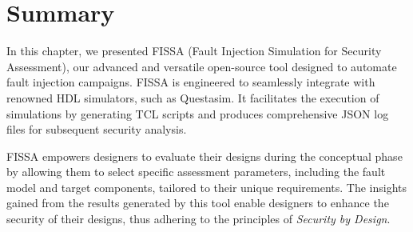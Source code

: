 \section{Summary}
In this chapter, we presented FISSA (Fault Injection Simulation for Security Assessment), our advanced and versatile open-source tool designed to automate fault injection campaigns. FISSA is engineered to seamlessly integrate with renowned HDL simulators, such as Questasim. It facilitates the execution of simulations by generating TCL scripts and produces comprehensive JSON log files for subsequent security analysis.

FISSA empowers designers to evaluate their designs during the conceptual phase by allowing them to select specific assessment parameters, including the fault model and target components, tailored to their unique requirements. The insights gained from the results generated by this tool enable designers to enhance the security of their designs, thus adhering to the principles of \textit{Security by Design}.


